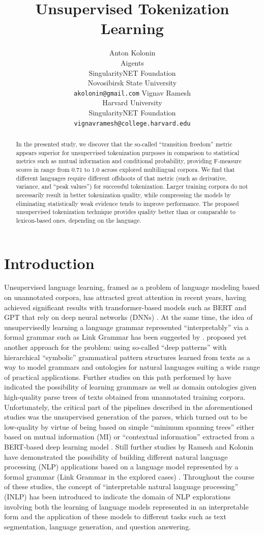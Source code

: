 \documentclass[11pt]{article}
\title{Unsupervised Tokenization Learning}
\author{Anton Kolonin \\ Aigents \\ SingularityNET Foundation \\ Novosibirsk State University \\ \texttt{akolonin@gmail.com}
         \And
        Vignav Ramesh \\ Harvard University \\ SingularityNET Foundation \\ \texttt{vignavramesh@college.harvard.edu}
}
\begin{document}
\maketitle
\begin{abstract}
In the presented study, we discover that the so-called “transition freedom” metric appears superior for unsupervised tokenization purposes in comparison to statistical metrics such as mutual information and conditional probability, providing F-measure scores in range from $0.71$ to $1.0$ across explored multilingual corpora. We find that different languages require different offshoots of that metric (such as derivative, variance, and “peak values”) for successful tokenization. Larger training corpora do not necessarily result in better tokenization quality, while compressing the models by eliminating statistically weak evidence tends to improve performance. The proposed unsupervised tokenization technique provides quality better than or comparable to lexicon-based ones, depending on the language.
\end{abstract}

\section{Introduction}

Unsupervised language learning, framed as a problem of language modeling based on unannotated corpora, has attracted great attention in recent years, having achieved significant results with transformer-based models such as BERT and GPT that rely on deep neural networks (DNNs) \citep{1,2}. At the same time, the idea of unsupervisedly learning a language grammar represented “interpretably” via a formal grammar such as Link Grammar has been suggested by \citet{3}. \citet{4} proposed yet another approach for the problem: using so-called “deep patterns” with hierarchical “symbolic” grammatical pattern structures learned from texts as a way to model grammars and ontologies for natural languages suiting a wide range of practical applications. Further studies on this path performed by \citet{5,6} have indicated the possibility of learning grammars as well as domain ontologies given high-quality parse trees of texts obtained from unannotated training corpora. Unfortunately, the critical part of the pipelines described in the aforementioned studies was the unsupervised generation of the parses, which turned out to be low-quality by virtue of being based on simple “minimum spanning trees” either based on mutual information (MI) \citep[see][]{7} or “contextual information” \citep[see][]{6} extracted from a BERT-based deep learning model \citep{1}. Still further studies by Ramesh and Kolonin have demonstrated the possibility of building different natural language processing (NLP) applications based on a language model represented by a formal grammar (Link Grammar in the explored cases) \citep{8,9,10}. Throughout the course of these studies, the concept of “interpretable natural language processing” (INLP) has been introduced to indicate the domain of NLP explorations involving both the learning of language models represented in an interpretable form and the application of these models to different tasks such as text segmentation, language generation, and question answering. 
\end{document}
